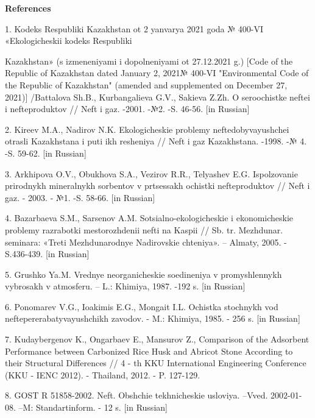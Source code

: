 \begin{center}
{\bfseries References}
\end{center}

\begin{noparindent}
1.
  Kodeks Respubliki Kazakhstan ot 2 yanvarya 2021 goda № 400-VI
  «Ekologicheskii kodeks Respubliki

  Kazakhstan» (s izmeneniyami i
  dopolneniyami ot 27.12.2021 g.) {[}Code of the Republic of Kazakhstan
  dated January 2, 2021№ 400-VI "Environmental Code of the Republic of
  Kazakhstan" (amended and supplemented on December 27, 2021){]}
  /Battalova Sh.B., Kurbangalieva G.V., Sakieva Z.Zh. O seroochistke
  neftei i nefteproduktov // Neft\textquotesingle{} i gaz. -2001. -№2.
  -S. 46-56. {[}in Russian{]}

2.
  Kireev M.A., Nadirov N.K. Ekologicheskie problemy neftedobyvayushchei
  otrasli Kazakhstana i puti ikh resheniya // Neft\textquotesingle{} i
  gaz Kazakhstana. -1998. -№ 4. -S. 59-62. {[}in Russian{]}

3.
  Arkhipova O.V., Obukhova S.A., Vezirov R.R., Telyashev E.G.
  Ispol\textquotesingle zovanie prirodnykh mineral\textquotesingle nykh
  sorbentov v prtsessakh ochistki nefteproduktov //
  Neft\textquotesingle{} i gaz. - 2003. - №1. -S. 58-66. {[}in
  Russian{]}

4.
  Bazarbaeva S.M., Sarsenov A.M.
  Sotsial\textquotesingle no-ekologicheskie i ekonomicheskie problemy
  razrabotki mestorozhdenii nefti na Kaspii // Sb. tr. Mezhdunar.
  seminara: «Tret\textquotesingle i Mezhdunarodnye Nadirovskie
  chteniya». -- Almaty, 2005. - S.436-439. {[}in Russian{]}

5.
  Grushko Ya.M. Vrednye neorganicheskie soedineniya v promyshlennykh
  vybrosakh v atmosferu. -- L.: Khimiya, 1987. -192 s. {[}in Russian{]}

6.
  Ponomarev V.G., Ioakimis E.G., Mongait I.L. Ochistka stochnykh vod
  neftepererabatyvayushchikh zavodov. - M.: Khimiya, 1985. - 256 s.
  {[}in Russian{]}

7.
  Kudaybergenov K., Ongarbaev E., Mansurov Z., Comparison of the
  Adsorbent Performance between Carbonized Rice Husk and Abricot Stone
  According to their Structural Differences // 4 - th KKU International
  Engineering Conference (KKU - IENC 2012). - Thailand, 2012. - P.
  127-129.

8.
  GOST R 51858-2002. Neft\textquotesingle. Obshchie tekhnicheskie
  usloviya. --Vved. 2002-01-08. --M: Standartinform. - 12 s. {[}in
  Russian{]}


\end{noparindent}
